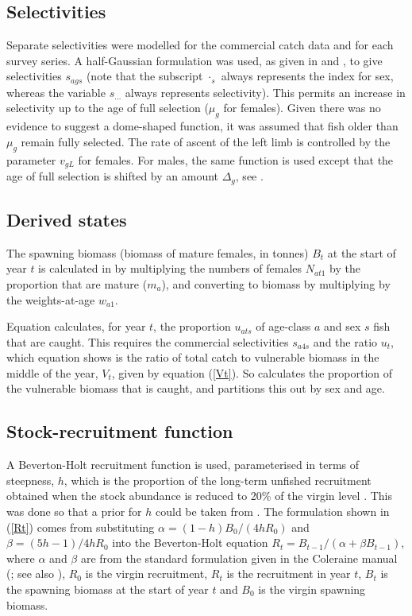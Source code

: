 \subsection{Selectivities}

Separate selectivities were modelled for the commercial catch data and for each survey series. A half-Gaussian formulation was used, as given in  and , to give selectivities $s_{ags}$ (note that the subscript $\cdot_s$ always represents the index for sex, whereas the variable $s_{...}$ always represents selectivity). This permits an increase in selectivity up to the age of full selection ($\mu_g$ for females). Given there was no evidence to suggest a dome-shaped function, it was assumed that fish older than $\mu_g$ remain fully selected. The rate of ascent of the left limb is controlled by the parameter $v_{gL}$ for females. For males, the same function is used except that the age of full selection is shifted by an amount $\Delta_g$, see . 


\subsection{Derived states}

The spawning biomass (biomass of mature females, in tonnes) $B_t$ at the start of year $t$ is calculated in  by multiplying the numbers of females $N_{at1}$ by the proportion that are mature ($m_a$), and converting to biomass by multiplying by the weights-at-age $w_{a1}$.

Equation  calculates, for year $t$, the proportion $u_{ats}$ of age-class $a$ and sex $s$ fish that are caught. This requires the commercial selectivities $s_{a4s}$ and the ratio $u_t$, which equation  shows is the ratio of total catch to vulnerable biomass in the middle of the year, $V_t$, given by equation (\ref{Vt}). So  calculates the proportion of the vulnerable biomass that is caught, and  partitions this out by sex and age.

\subsection{Stock-recruitment function}

A Beverton-Holt recruitment function is used, parameterised in terms of steepness, $h$, which is the proportion of the long-term unfished recruitment obtained when the stock abundance is reduced to 20\% of the virgin level \citep{md88, mm04}. This was done so that a prior for $h$ could be taken from \citet{fmdms10}. The formulation shown in (\ref{Rt}) comes from substituting $\alpha = (1 - h) B_0 / (4 h R_0)$ and $\beta = (5 h - 1) / 4 h R_0$ into the Beverton-Holt equation $R_t = B_{t-1} / (\alpha + \beta B_{t-1})$, where $\alpha$ and $\beta$ are from the standard formulation given in the Coleraine manual (\citealt{hmpeps03}; see also \citealt{mm04}), $R_0$ is the virgin recruitment, $R_t$ is the recruitment in year $t$, $B_t$ is the spawning biomass at the start of year $t$ and $B_0$ is the virgin spawning biomass. 


